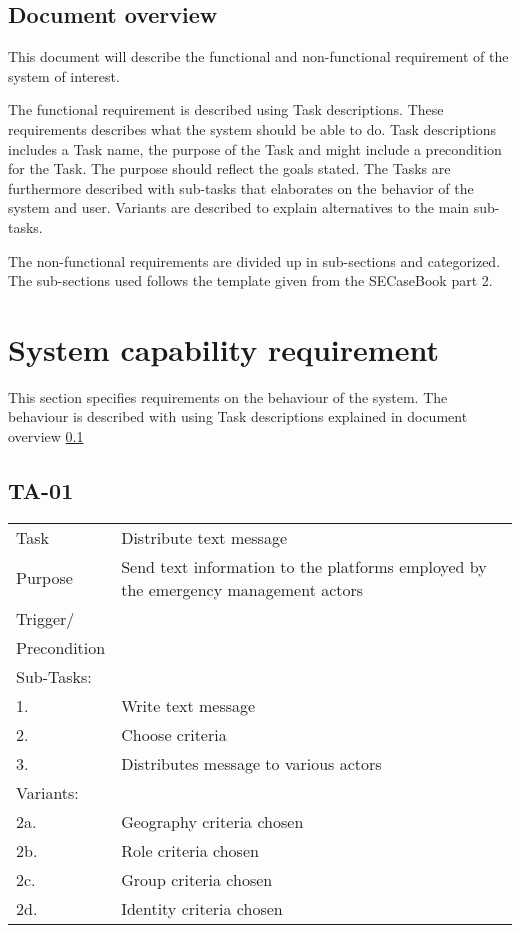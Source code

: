 \subsection{Document overview}
\label{sec_documentOverview}
This document will describe the functional and non-functional requirement of the system of interest. 

The functional requirement is described using Task descriptions. These requirements describes what the system should be able to do. Task descriptions includes a Task name, the purpose of the Task and might include a precondition for the Task. The purpose should reflect the goals stated. The Tasks are furthermore described with sub-tasks that elaborates on the behavior of the system and user.  Variants are described to explain alternatives to the main sub-tasks. \citep{taskDescription}

The non-functional requirements are divided up in sub-sections and categorized. The sub-sections used follows the template given from the SECaseBook part 2. \citep{casebook}



\newpage
\section{System capability requirement}
This section specifies requirements on the behaviour of the system. The behaviour is described with using Task descriptions explained in document overview \ref{sec_documentOverview}

\subsection{TA-01}
\begin{longtable}{| p{2.5cm}  | p{10cm} |  }
	\hline
	Task & Distribute text message \\
	Purpose & Send text information to the platforms employed by the emergency management actors \\
	Trigger/ &  \\ Precondition &  \\
	\hline
	Sub-Tasks: & \\
	1. & Write text message\\
	2. & Choose criteria \\
	3. & Distributes message to various actors \\
	\hline
	Variants: & \\
	2a. & Geography criteria chosen \\
	2b. & Role criteria chosen\\
	2c. & Group criteria chosen\\
	2d. & Identity criteria chosen\\
	\hline
\end{longtable}



